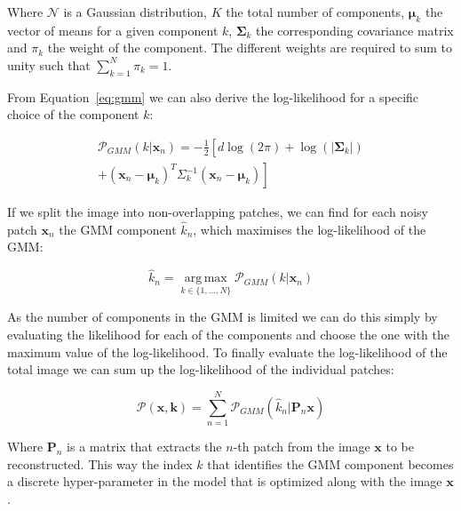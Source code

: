 \documentclass[twocolumn]{aastex631}
\DeclareMathOperator*{\argmax}{arg\,max}
\begin{document}
    Where $\mathcal{N}$ is a Gaussian distribution, $K$ the total number of components, $\boldsymbol{\mu}_k$ the vector of means for a given component $k$, $\boldsymbol{\Sigma}_k$ the corresponding covariance matrix
    and $\pi_k$ the weight of the component. The different weights are required to sum to unity such that $\sum_{k=1}^N\pi_k = 1$. 

    From Equation~\ref{eq:gmm} we can also derive the log-likelihood for a specific choice of the component $k$:
        
    \begin{equation}
    \begin{split}
    \mathcal{P}_{GMM}(k| \mathbf{x}_n) = -\frac{1}{2} \left[ \right. d \log(2\pi)
    + \log(|\boldsymbol \Sigma_{k}|)\\
    + (\mathbf{x}_n - \boldsymbol{\mu}_{k})^T \Sigma^{-1}_{k}(\mathbf{x}_n - \boldsymbol{\mu}_{k}) \left. \right]
    \end{split}
    \end{equation}

    If we split the image into non-overlapping patches, we can find for each noisy patch $\mathbf{x}_n$ the GMM component $\hat{k}_n$, which maximises the log-likelihood of the GMM:
        
    \begin{equation}
        \hat{k}_n = \underset{k \in \{1, ..., N\} }{\argmax}{\mathcal{P}_{GMM}(k| \mathbf{x}_n)}
    \end{equation}
    \vspace{0.2em}

    As the number of components in the GMM is limited we can do this simply by evaluating the likelihood for each of the components and choose the one with
    the maximum value of the log-likelihood. To finally evaluate the log-likelihood
    of the total image we can sum up the log-likelihood of the individual patches: 

    \begin{equation}
        \mathcal{P}(\mathbf{x}, \mathbf{k}) = \sum_{n = 1}^N \mathcal{P}_{GMM}(\hat{k}_n | \mathbf{P}_n \mathbf{x})
    \end{equation}

    Where $\mathbf{P}_n$ is a matrix that extracts the $n$-th patch
    from the image $\mathbf{x}$ to be reconstructed. This way the index $k$ that identifies the GMM component becomes a discrete hyper-parameter in the model that is optimized along with the image $\mathbf{x}$.
    
\end{document}
